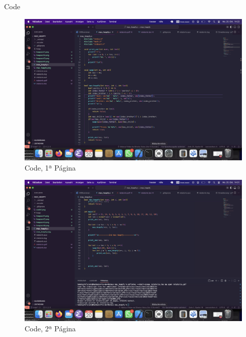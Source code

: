 \documentclass{article}
\begin{document}
    \clearpage

    \centerline{\Huge Code}

    \clearpage
    
    \begin{figure}
        \centering
        \includegraphics[width=1.3\linewidth]{code1.png}
        \caption{Code, 1ª Página}
        \label{fig:fig6}
    \end{figure}

    \begin{figure}
        \centering
        \includegraphics[width=1.3\linewidth]{code2.png}
        \caption{Code, 2ª Página}
        \label{fig:fig6}
    \end{figure}
\end{document}
